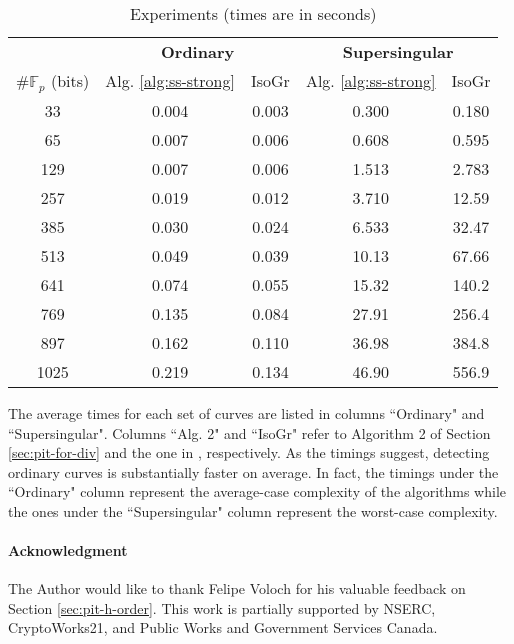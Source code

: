 \documentclass[12pt]{article}
\theoremstyle{plain}
\theoremstyle{definition}
\def\F{\ensuremath{\mathbb{F}}}
\begin{document}
\begin{table}[H]
	\centering
	\small
	\begin{tabular}{ccccc}
		& \multicolumn{2}{c}{\bfseries Ordinary} & \multicolumn{2}{c}{\bfseries Supersingular} \\
		\cmidrule(lr){2-3} \cmidrule(lr){4-5} 
		$\#\F_p$ (bits) & Alg. \ref{alg:ss-strong} & IsoGr & Alg. 
		\ref{alg:ss-strong} & IsoGr \\
		\midrule[0.7pt]
		33 & 0.004 & 0.003 & 0.300 & 0.180 \\
		65 & 0.007 & 0.006 & 0.608 & 0.595 \\
		129 & 0.007 & 0.006 & 1.513 & 2.783 \\
		257 & 0.019 & 0.012 & 3.710 & 12.59 \\
		385 & 0.030 & 0.024 & 6.533 & 32.47 \\
		513 & 0.049 & 0.039 & 10.13 & 67.66 \\
		641 & 0.074 & 0.055 & 15.32 & 140.2 \\
		769 & 0.135 & 0.084 & 27.91 & 256.4 \\
		897 & 0.162 & 0.110 & 36.98 & 384.8 \\
		1025 & 0.219 & 0.134 & 46.90 & 556.9 \\		
		\midrule[0.7pt]
	\end{tabular}
	\caption{Experiments (times are in seconds)}
	\label{table:exper}
\end{table}

The average times for each set of curves are listed in columns ``Ordinary" and ``Supersingular". 
Columns ``Alg. 2" and ``IsoGr" refer to Algorithm 2 of Section \ref{sec:pit-for-div} 
and the one in \cite{sutherland2012}, respectively. As the timings suggest, detecting ordinary 
curves is substantially faster on average. In fact, the timings under the ``Ordinary" column 
represent the average-case complexity of the algorithms while the ones under the ``Supersingular" 
column represent the worst-case complexity.

\paragraph{Acknowledgment}
The Author would like to thank Felipe Voloch for his valuable feedback on Section 
\ref{sec:pit-h-order}. This work is partially supported by NSERC, CryptoWorks21, and Public Works 
and Government Services Canada.






\end{document}

